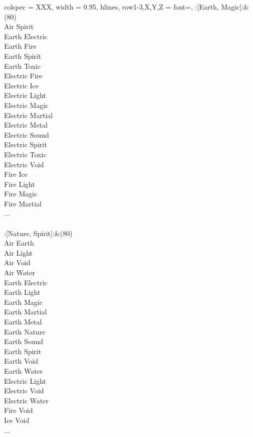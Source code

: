 \begin{longtblr}[
	caption = {2v2 Attacking Effective},
	label = {2v2-Attacking-Effective},
]{
	colspec = {XXX}, width = 0.95\linewidth,
	hlines,
	row{1-3,X,Y,Z} = {font=\bfseries},
}
	:[Earth, Magic]:&{(80)\\
	Air Spirit \\
	Earth Electric \\
	Earth Fire \\
	Earth Spirit \\
	Earth Toxic \\
	Electric Fire \\
	Electric Ice \\
	Electric Light \\
	Electric Magic \\
	Electric Martial \\
	Electric Metal \\
	Electric Sound \\
	Electric Spirit \\
	Electric Toxic \\
	Electric Void \\
	Fire Ice \\
	Fire Light \\
	Fire Magic \\
	Fire Martial \\
	...\\
	}\\

	:[Nature, Spirit]:&{(80)\\
	Air Earth \\
	Air Light \\
	Air Void \\
	Air Water \\
	Earth Electric \\
	Earth Light \\
	Earth Magic \\
	Earth Martial \\
	Earth Metal \\
	Earth Nature \\
	Earth Sound \\
	Earth Spirit \\
	Earth Void \\
	Earth Water \\
	Electric Light \\
	Electric Void \\
	Electric Water \\
	Fire Void \\
	Ice Void \\
	...\\
	}\\


\end{longtblr}
